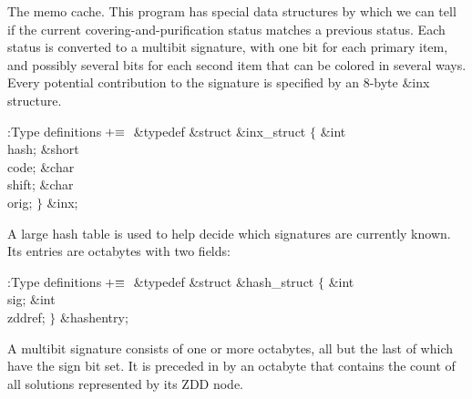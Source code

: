 The memo cache. This program has special data structures by which we
can tell if the current covering-and-purification status matches
a previous status. Each status is converted to a multibit signature,
with one bit for each primary item, and possibly several bits for
each second item that can be colored in several ways. Every potential
contribution to the signature is specified by an 8-byte \&{inx} structure.

\Y\B\4:Type definitions\X${}\mathrel+\equiv{}$\6
\&{typedef} \&{struct} \&{inx\_struct} ${}\{{}$\1\6
\&{int} \\{hash};\6
\&{short} \\{code};\6
\&{char} \\{shift};\6
\&{char} \\{orig};\2\6
${}\}{}$ \&{inx};\par
\fi

A large hash table is used to help decide which signatures are currently
known. Its entries are octabytes with two fields:

\Y\B\4:Type definitions\X${}\mathrel+\equiv{}$\6
\&{typedef} \&{struct} \&{hash\_struct} ${}\{{}$\1\6
\&{int} \\{sig};\6
\&{int} \\{zddref};\2\6
${}\}{}$ \&{hashentry};\par
\fi

A multibit signature consists of one or more octabytes, all but the
last of which have the sign bit set. It is preceded in  by
an octabyte that contains the count of all solutions represented by
its ZDD node.

